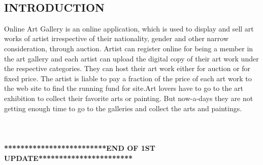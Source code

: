 \documentclass{article}
\begin{document}
\\
\begin{center}
   \section*{\textbf{INTRODUCTION}} 
\end{center}
Online Art Gallery is an online application, which is used to display and sell art works of artist irrespective of their nationality, gender and other narrow consideration, through auction. Artist can register online for being a member in the art gallery and each artist can upload the digital copy of their art work under the respective categories. They can host their art work either for auction or for fixed price. The artist is liable to pay a fraction of the price of each art work to the web site to find the running fund for site.Art lovers have to go to the art exhibition to collect their favorite arts or painting. But now-a-days they are not getting enough time to go to the galleries and collect the arts and paintings.
\\
\\
\\
\\
\textbf{*************************END OF 1ST UPDATE***********************}
\end{document}

